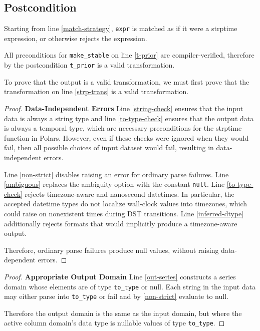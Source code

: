 \documentclass{article}
\begin{document}
\subsection*{Postcondition}
\begin{theorem}
\end{theorem}
Starting from line \ref{match-strategy},
\texttt{expr} is matched as if it were a strptime expression, or otherwise rejects the expression.

All preconditions for \texttt{make\_stable} on line \ref{t-prior} are compiler-verified,
therefore by the postcondition \texttt{t\_prior} is a valid transformation.

To prove that the output is a valid transformation,
we must first prove that the transformation on line \ref{strp-trans} is a valid transformation.

\begin{proof}
    \textbf{Data-Independent Errors}
    Line \ref{string-check} ensures that the input data is always a string type and
    line \ref{to-type-check} ensures that the output data is always a temporal type,
    which are necessary preconditions for the strptime function in Polars.
    However, even if these checks were ignored when they would fail,
    then all possible choices of input dataset would fail,
    resulting in data-independent errors.

    Line \ref{non-strict} disables raising an error for ordinary parse failures.
    Line \ref{ambiguous} replaces the ambiguity option with the constant \texttt{null}.
    Line \ref{to-type-check} rejects timezone-aware and nanosecond datetimes.
    In particular, the accepted datetime types do not localize wall-clock values
    into timezones, which could raise on nonexistent times during DST transitions.
    Line \ref{inferred-dtype} additionally rejects formats that would implicitly
    produce a timezone-aware output.

    Therefore, ordinary parse failures produce null values,
    without raising data-dependent errors.
\end{proof}

\begin{proof}
    \textbf{Appropriate Output Domain}
    Line \ref{out-series} constructs a series domain whose elements are of type \texttt{to\_type} or null.
    Each string in the input data may either parse into \texttt{to\_type} or fail and by \ref{non-strict} evaluate to null.

    Therefore the output domain is the same as the input domain,
    but where the active column domain's data type is nullable values of type \texttt{to\_type}.
\end{proof}
\end{document}
